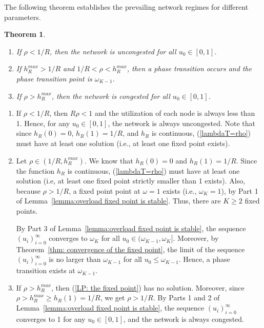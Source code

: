 \documentclass{IEEEtran}
\newtheorem{theorem}{Theorem}
\begin{document}
The following theorem establishes the prevailing network regimes for different parameters.
\begin{theorem} \label{Thm: three stages}
\leavevmode
\begin{enumerate}
\item If $\rho < 1/R$, then the network is uncongested for all $u_0 \in [0,1]$.
\item If $h^{max}_R > 1/R$ and $1/R < \rho < h^{max}_R$, then a phase transition occurs and the phase transition point is  $\omega_{K-1}$.
\item If $\rho > h^{max}_R$, then the network is congested for all $u_0 \in [0,1]$.

\end{enumerate}
\end{theorem}
\begin{IEEEproof}
\leavevmode
\begin{enumerate}
\item If $\rho < 1/R$, then $R \rho < 1$ and the utilization of each node is always less than 1. Hence, for any $u_0 \in [0,1]$,  the network is
    always uncongested. Note that since $h_R(0)=0$, $h_R(1)=1/R$, and $h_R$ is continuous,  (\ref{lambdaT=rho}) must have at least one solution
    (i.e., at least one fixed point exists).

\item Let $\rho \in (1/R, h^{max}_R)$. We know that $h_R(0) = 0$ and $h_R(1)=1/R$. Since the function $h_R$ is continuous,  (\ref{lambdaT=rho})
    must have at least one solution (i.e, at least one fixed point strictly smaller than 1 exists). Also,  because $\rho > 1/R$, a fixed point
    point at $\omega=1$ exists (i.e., $\omega_K=1$), by Part 1 of Lemma~\ref{lemma:overload fixed point is stable}.  Thus, there are $K \geq 2$
    fixed points.

By Part 3 of Lemma~\ref{lemma:overload fixed point is stable}, the sequence $(u_i)_{i=0}^{\infty}$ converges to $\omega_K$ for all $u_0 \in
(\omega_{K-1},\omega_K]$.  Moreover, by Theorem~\ref{thm: convergence of the fixed point}, the limit of the sequence $(u_i)_{i=0}^{\infty}$ is no
larger than $\omega_{K-1}$ for all $u_0 \leq \omega_{K-1}$. Hence, a phase transition exists at $\omega_{K-1}$.



\item If $\rho > h^{max}_R$, then (\ref{LP: the fixed point}) has no solution.  Moreover, since $\rho > h^{max}_R \geq h_R(1) = 1/R$, we get $\rho
    > 1/R$. By Parts 1 and 2 of Lemma~\ref{lemma:overload fixed point is stable}, the sequence $(u_i)_{i=0}^{\infty}$ converges to 1 for any $u_0
    \in [0,1]$, and the network is always congested.


\end{enumerate}
\end{IEEEproof}
\end{document}
